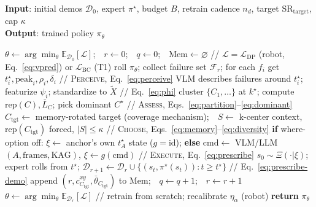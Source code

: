 \documentclass[letterpaper]{article} %
\begin{document}
\begin{algorithm}[tb]
\caption{PACE: Perceive $\rightarrow$ Assess $\rightarrow$ Choose $\rightarrow$
Execute. Written modality-agnostically ($\mathcal{L}$ is the task loss); the T1
grid replaces the Perceive signal and the prescribe map $g$ as described in the
Method, keeping the Assess/Choose core.}
\label{alg:pace}
\textbf{Input}: initial demos $\mathcal{D}_0$, expert $\pi^\star$, budget $B$,
retrain cadence $n_d$, target $\mathrm{SR}_{\mathrm{target}}$, cap $\kappa$\\
\textbf{Output}: trained policy $\pi_\theta$
\begin{algorithmic}[1]
\STATE $\theta \leftarrow \arg\min_\theta \mathbb{E}_{\mathcal{D}_0}[\mathcal{L}]$;\ \ $r\leftarrow 0$;\ \ $q\leftarrow 0$;\ \ $\mathrm{Mem}\leftarrow\varnothing$ \hfill{\footnotesize// $\mathcal{L}{=}\mathcal{L}_{\mathrm{DP}}$ (robot, Eq.~\ref{eq:vpred}) or $\mathcal{L}_{\mathrm{BC}}$ (T1)}
  \STATE roll $\pi_\theta$; collect failure set $\mathcal{F}_r$; for each $f_i$ get $t^\star_i,\mathrm{peak}_i,\rho_i,\delta_i$ \hfill{\footnotesize// \textsc{Perceive}, Eq.~\ref{eq:perceive}}
  \STATE VLM describes failures around $t^\star_i$; featurize $\psi_i$; standardize to $\tilde X$ \hfill{\footnotesize// Eq.~\ref{eq:phi}}
  \STATE cluster $\{C_1,\dots\}$ at $k^\star$; compute $\mathrm{rep}(C),\bar L_C$; pick dominant $C^\star$ \hfill{\footnotesize// \textsc{Assess}, Eqs.~\ref{eq:partition}--\ref{eq:dominant}}
  \STATE $C_{\mathrm{tgt}}\leftarrow$ memory-rotated target (coverage mechanism);\ \ $S\leftarrow$ k-center context, $\mathrm{rep}(C_{\mathrm{tgt}})$ forced, $|S|\!\le\!\kappa$ \hfill{\footnotesize// \textsc{Choose}, Eqs.~\ref{eq:memory}--\ref{eq:diversity}}
  \STATE \textbf{if} where-option off: $\xi\leftarrow$ anchor's own $t^\star_A$ state ($g{=}\mathrm{id}$); \textbf{else} $\mathrm{cmd}\leftarrow$ VLM/LLM$(A,\mathrm{frames},\mathrm{KAG})$, $\xi\leftarrow g(\mathrm{cmd})$ \hfill{\footnotesize// \textsc{Execute}, Eq.~\ref{eq:prescribe}}
  \STATE $s_0\!\sim\!\Xi(\cdot|\xi)$; expert rolls from $t^\star$; $\mathcal{D}_{r+1}\!\leftarrow\!\mathcal{D}_r\cup\{(s_t,\pi^\star(s_t)):t\ge t^\star\}$ \hfill{\footnotesize// Eq.~\ref{eq:prescribe-demo}}
  \STATE append $(r,c^{xy}_{C_{\mathrm{tgt}}},\bar\theta_{C_{\mathrm{tgt}}})$ to $\mathrm{Mem}$;\ \ $q\leftarrow q+1$;\ \ $r\leftarrow r+1$
    \STATE $\theta \leftarrow \arg\min_\theta \mathbb{E}_{\mathcal{D}_r}[\mathcal{L}]$ \hfill{\footnotesize// retrain from scratch; recalibrate $\eta_\alpha$ (robot)}
  \ENDIF
\ENDWHILE
\STATE \textbf{return} $\pi_\theta$
\end{algorithmic}
\end{algorithm}
\end{document}
